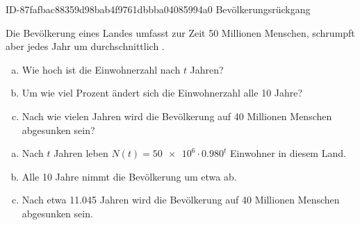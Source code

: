 \begin{exercise}
      {ID-87fafbac88359d98bab4f9761dbbba04085994a0}
      {Bevölkerungsrückgang}
  \ifproblem\problem\par
    Die Bevölkerung eines Landes umfasst zur Zeit 50 Millionen
    Menschen, schrumpft aber jedes Jahr um durchschnittlich .
    \begin{enumerate}[a)]
      \item Wie hoch ist die Einwohnerzahl nach $t$ Jahren?
      \item Um wie viel Prozent ändert sich die Einwohnerzahl alle
            10 Jahre?
      \item Nach wie vielen Jahren wird die Bevölkerung auf 40
            Millionen Menschen abgesunken sein?
    \end{enumerate}
  \fi
  \ifoutcome\outcome\par
    \begin{enumerate}[a)]
      \item Nach $t$ Jahren leben $N(t)=\num{50e6}\cdot\num{0.980}^{t}$ Einwohner
            in diesem Land.
      \item Alle 10 Jahre nimmt die Bevölkerung um etwa  ab.
      \item Nach etwa \num{11.045} Jahren wird die Bevölkerung auf 40
            Millionen Menschen abgesunken sein.
    \end{enumerate}
  \fi
\end{exercise}
